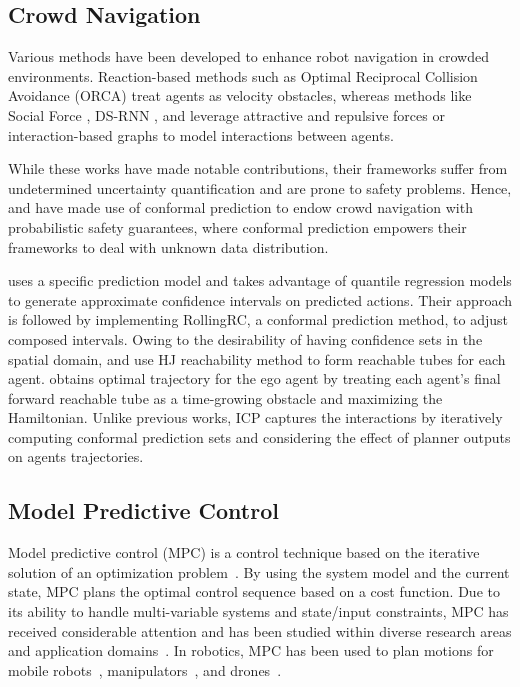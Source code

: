 \subsection{Crowd Navigation}
Various methods have been developed to enhance robot navigation in crowded environments. Reaction-based methods such as Optimal Reciprocal Collision Avoidance (ORCA) \cite{van2011reciprocal} treat agents as velocity obstacles, whereas methods like Social Force \cite{helbing1995social}, DS-RNN \cite{liu2021decentralized}, and \cite{liu2023intention} leverage attractive and repulsive forces or interaction-based graphs to model interactions between agents.

While these works have made notable contributions, their frameworks suffer from undetermined uncertainty quantification and are prone to safety problems. Hence, \cite{lindemann2023safe} and \cite{Muthali2023Multi-agent} have made use of conformal prediction to endow crowd navigation with probabilistic safety guarantees, where conformal prediction empowers their frameworks to deal with unknown data distribution.

\cite{Muthali2023Multi-agent} uses a specific prediction model and takes advantage of quantile regression models to generate approximate confidence intervals on predicted actions. Their approach is followed by implementing RollingRC, a conformal prediction method, to adjust composed intervals. Owing to the desirability of having confidence sets in the spatial domain, \cite{Muthali2023Multi-agent} and \cite{lin2024verification} use HJ reachability method to form reachable tubes for each agent. \cite{Muthali2023Multi-agent} obtains optimal trajectory for the ego agent by treating each agent's final forward reachable tube as a time-growing obstacle and maximizing the Hamiltonian.
Unlike previous works, ICP captures the interactions by iteratively computing conformal prediction sets and considering the effect of planner outputs on agents trajectories. 

\subsection{Model Predictive Control}
Model predictive control (MPC) is a control technique based on the iterative solution of an optimization problem~\cite{bemporad2007robust}. By using the system model and the current state, MPC plans the optimal control sequence based on a cost function. Due to its ability to handle multi-variable systems and state/input constraints, MPC has received considerable attention and has been studied within diverse research areas and application domains~\cite{garcia1989model,qin2003survey}. In robotics, MPC has been used to plan motions for mobile robots~\cite{chen2021interactive,sivakumar2021learned}, manipulators~\cite{incremona2017mpc}, and drones~\cite{ji2022robust,kamel2017robust}.

